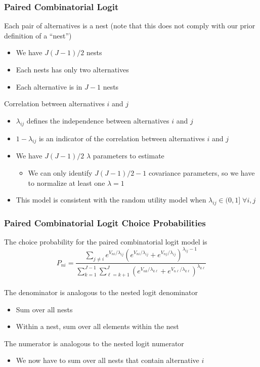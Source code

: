 \documentclass{beamer}
\begin{document}
\begin{frame}\frametitle{Paired Combinatorial Logit}
    Each pair of alternatives is a nest (note that this does not comply with our prior definition of a ``nest'')
    \begin{itemize}
    	\item We have $J (J - 1) / 2$  nests
    	\item Each nests has only two alternatives
    	\item Each alternative is in $J - 1$ nests
    \end{itemize}
    \vspace{2ex}
    Correlation between alternatives $i$ and $j$
    \begin{itemize}
    	\item $\lambda_{ij}$ defines the independence between alternatives $i$ and $j$
    	\item $1 - \lambda_{ij}$ is an indicator of the correlation between alternatives $i$ and $j$
    	\item We have $J (J - 1) / 2$ $\lambda$ parameters to estimate
    	\begin{itemize}
    		\item We can only identify $J (J - 1) / 2 - 1$ covariance parameters, so we have to normalize at least one $\lambda = 1$
    	\end{itemize}
    	\item This model is consistent with the random utility model when $\lambda_{ij} \in (0, 1] \; \forall i,j$ 
    \end{itemize}
\end{frame}

\begin{frame}\frametitle{Paired Combinatorial Logit Choice Probabilities}
    The choice probability for the paired combinatorial logit model is
    $$P_{ni} = \frac{\sum_{j \neq i} e^{V_{ni} / \lambda_{ij}} \left( e^{V_{ni} / \lambda_{ij}} + e^{V_{nj} / \lambda_{ij}} \right)^{\lambda_{ij} - 1}}{\sum_{k = 1}^{J - 1} \sum_{\ell = k + 1}^J \left( e^{V_{nk} / \lambda_{k \ell}} + e^{V_{n \ell} / \lambda_{k \ell}} \right)^{\lambda_{k \ell}}}$$ \\
    \vspace{2ex}
    The denominator is analogous to the nested logit denominator
    \begin{itemize}
    	\item Sum over all nests
    	\item Within a nest, sum over all elements within the nest
    \end{itemize}
    \vspace{2ex}
    The numerator is analogous to the nested logit numerator
    \begin{itemize}
    	\item We now have to sum over all nests that contain alternative $i$
    \end{itemize}
\end{frame}
\end{document}
